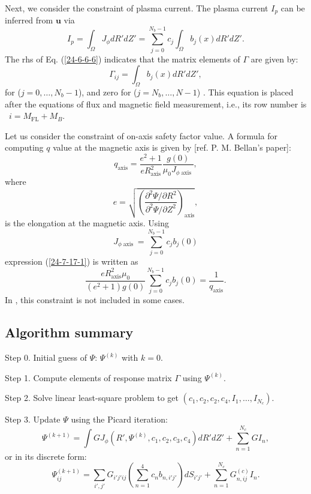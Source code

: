 \documentclass{llncs}
\newcommand{\tmop}[1]{\ensuremath{\operatorname{#1}}}
\newcommand{\tmtexttt}[1]{\text{{\ttfamily{#1}}}}
\begin{document}
Next, we consider the constraint of plasma current. The plasma current $I_p$
can be inferred from $\mathbf{u}$ via
\begin{equation}
  \label{24-6-6-6} I_p = \int_{\Omega} J_{\phi} d R' d Z' = \sum_{j = 0}^{N_b
  - 1} c_j \int_{\Omega} b_j (x) d R' d Z' .
\end{equation}
The rhs of Eq. (\ref{24-6-6-6}) indicates that the matrix elements of $\Gamma$
are given by:
\begin{equation}
  \Gamma_{i j} = \int_{\Omega} b_j (x) d R' d Z',
\end{equation}
for  ($j = 0, \ldots, N_b - 1$), and zero for  ($j = N_b, \ldots, N - 1$) .
This equation is placed after the equations of flux and magnetic field
measurement, i.e., its row number is \ $i = M_{\tmop{FL}} + M_B$.

Let us consider the constraint of on-axis safety factor value. A formula for
computing $q$ value at the magnetic axis is given by [ref. P. M. Bellan's
paper]:
\begin{equation}
  \label{24-7-17-1} q_{\tmop{axis}} = \frac{e^2 + 1}{e R_{\tmop{axis}}^2}
  \frac{g (0)}{\mu_0 J_{\phi \tmop{axis}}},
\end{equation}
where
\begin{equation}
  e = \sqrt{\left( \frac{\partial^2 \Psi / \partial R^2}{\partial^2 \Psi /
  \partial Z^2} \right)_{\tmop{axis}}},
\end{equation}
is the elongation at the magnetic axis. Using
\[ J_{\phi \tmop{axis}} = \sum_{j = 0}^{N_b - 1} c_j b_j (0) \]
expression (\ref{24-7-17-1}) is written as
\begin{equation}
  \frac{e R_{\tmop{axis}}^2 \mu_0}{(e^2 + 1) g (0)} \sum_{j = 0}^{N_b - 1} c_j
  b_j (0) = \frac{1}{q_{\tmop{axis}}} .
\end{equation}
In \tmtexttt{HEQ}, this constraint is not included in some cases.

\subsection{Algorithm summary}\label{24-11-9-e1}

Step 0. Initial guess of $\Psi$: $\Psi^{(k)}$ with $k = 0$.

Step 1. Compute elements of response matrix $\Gamma$ using $\Psi^{(k)}$.

Step 2. Solve linear least-square problem to get $(c_1, c_2, c_2, c_4, I_1,
\ldots, I_{N_c})$.

Step 3. Update $\Psi$ using the Picard iteration:
\begin{equation}
  \Psi^{(k + 1)} = \int G J_{\phi} (R', \Psi^{(k)}, c_1, c_2, c_3, c_4) d R' d
  Z' + \sum_{n = 1}^{N_c} G I_n,
\end{equation}
\qquad or in its discrete form:
\begin{equation}
  \Psi^{(k + 1)}_{i j} = \sum_{i', j'} G_{i' j' i j} \left( \sum_{n = 1}^4 c_n
  b_{n, i' j'} \right) d S_{i' j'} + \sum_{n = 1}^{N_c} G_{n, i j}^{(c)} I_n .
\end{equation}
\end{document}
